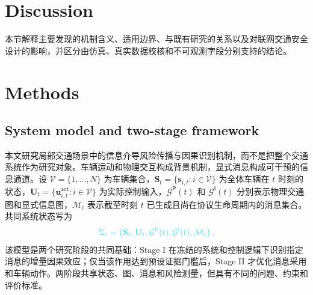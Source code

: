 \documentclass[10pt,a4paper,twocolumn]{article}
\newcommand{\revGreen}[1]{#1}
\newcommand{\revYellow}[1]{#1}
\newcommand{\revBlue}[1]{#1}
\newcommand{\revRed}[1]{#1}
\begin{document}
\section*{Discussion}
本节解释主要发现的机制含义、适用边界、与既有研究的关系以及对联网交通安全设计的影响，并区分由仿真、真实数据校核和不可观测字段分别支持的结论。

\renewcommand{\revGreen}[1]{\textcolor{advisorGreen}{#1}}
\renewcommand{\revYellow}[1]{\textcolor{advisorYellow!75!black}{#1}}
\renewcommand{\revBlue}[1]{\textcolor{advisorBlue!70!black}{#1}}
\renewcommand{\revRed}[1]{\textcolor{advisorRed}{#1}}
\section*{Methods}
\subsection*{System model and two-stage framework}
\revBlue{本文研究局部交通场景中的信息介导风险传播与因果识别机制，而不是把整个交通系统作为研究对象。车辆运动和物理交互构成背景机制，显式消息构成可干预的信息通道。设 $\mathcal V=\{1,\ldots,N\}$ 为车辆集合，$\mathbf S_t=\{\mathbf s_{i,t}:i\in\mathcal V\}$ 为全体车辆在 $t$ 时刻的状态，$\mathbf U_t=\{\mathbf u_{i,t}^{\mathsf{act}}:i\in\mathcal V\}$ 为实际控制输入，$\mathcal G^{\mathsf P}(t)$ 和 $\mathcal G^{\mathsf I}(t)$ 分别表示物理交通图和显式信息图，$\mathcal M_t$ 表示截至时刻 $t$ 已生成且尚在协议生命周期内的消息集合。共同系统状态写为}
\begin{equation}
\color{advisorBlue}
\Sigma_t=\left(\mathbf S_t,\mathbf U_t,\mathcal G^{\mathsf P}(t),\mathcal G^{\mathsf I}(t),\mathcal M_t\right),
\end{equation}
\revBlue{该模型是两个研究阶段的共同基础：Stage I 在冻结的系统和控制逻辑下识别指定消息的增量因果效应；仅当该作用达到预设证据门槛后，Stage II 才优化消息采用和车辆动作。两阶段共享状态、图、消息和风险测量，但具有不同的问题、约束和评价标准。}
\end{document}
